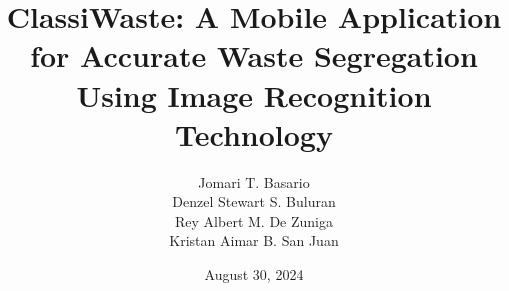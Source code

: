 \documentclass[10pt,a4paper]{article}
\title{ClassiWaste: A Mobile Application for Accurate Waste Segregation Using Image Recognition Technology}
\author{Jomari T. Basario \\Denzel Stewart S. Buluran \\Rey Albert M. De Zuniga \\Kristan Aimar B. San Juan}
\date{August 30, 2024}
\begin{document}
	\begin{titlingpage}
	\maketitle
	\end{titlingpage}
	
	\newpage
	\tableofcontents
	
	\newpage
	
	
	\newpage
	
	
	\newpage
	
	
	\newpage
	
	
\end{document}
